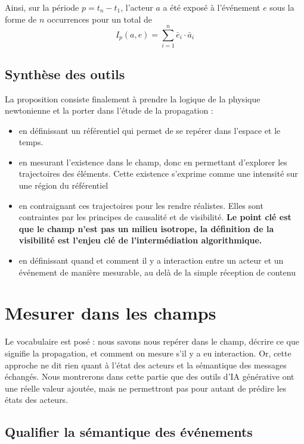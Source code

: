 \documentclass[11pt]{article}
\begin{document}
				Ainsi, sur la période $p = t_n - t_1$, l'acteur $a$ a été exposé à l'événement $e$ sous la forme de $n$ occurrences pour un total de $$I_p(a,e) = \sum_{i=1}^n \bar{e}_i \cdot \bar{a}_i$$
			
		\subsection{Synthèse des outils}
		
			La proposition consiste finalement à prendre la logique de la physique newtonienne et la porter dans l'étude de la propagation : 
			\begin{itemize}
				\item en définissant un référentiel qui permet de se repérer dans l'espace et le temps.
				\item en mesurant l'existence dans le champ, donc en permettant d'explorer les trajectoires des éléments. Cette existence s'exprime comme une intensité sur une région du référentiel
				\item en contraignant ces trajectoires pour les rendre réalistes. Elles sont contraintes par les principes de causalité et de visibilité. \textbf{Le point clé est que le champ n'est pas un milieu isotrope, la définition de la visibilité est l'enjeu clé de l'intermédiation algorithmique.}
				\item en définissant quand et comment il y a interaction entre un acteur et un événement de manière mesurable, au delà de la simple réception de contenu
			\end{itemize}
	
	\section{Mesurer dans les champs}
		
		Le vocabulaire est posé : nous savons nous repérer dans le champ, décrire ce que signifie la propagation, et comment on mesure s'il y a eu interaction. Or, cette approche ne dit rien quant à l'état des acteurs et la sémantique des messages échangés. Nous montrerons dans cette partie que des outils d'IA générative ont une réelle valeur ajoutée, mais ne permettront pas pour autant de prédire les états des acteurs. 
		
		\subsection{Qualifier la sémantique des événements}
		
\end{document}
